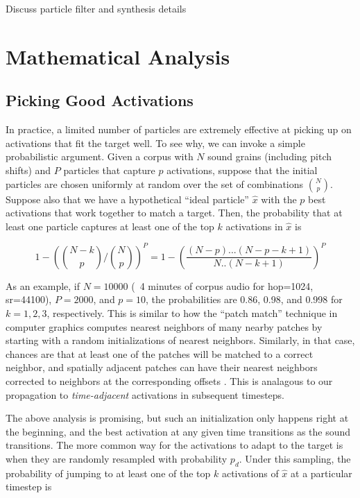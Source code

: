 \documentclass{article}
\begin{document}
Discuss particle filter and synthesis details


\section{Mathematical Analysis}

\subsection{Picking Good Activations}

In practice, a limited number of particles are extremely effective at picking up on activations that fit the target well.  To see why, we can invoke a simple probabilistic argument.  Given a corpus with $N$ sound grains (including pitch shifts) and $P$ particles that capture $p$ activations, suppose that the initial particles are chosen uniformly at random over the set of combinations $\binom{N}{p}$.  Suppose also that we have a hypothetical ``ideal particle'' $\hat{x}$ with the $p$ best activations that work together to match a target.  Then, the probability that at least one particle captures at least one of the top $k$ activations in $\hat{x}$ is  

\begin{equation}
    \label{eq:initialsampleprob}
    1 - \left(\binom{N-k}{p} / \binom{N}{p}\right)^P = 1 - \left( \frac{(N-p)...(N-p-k+1)}{N..(N-k+1)}\right) ^P
\end{equation}

As an example, if $N = 10000$ (~4 minutes of corpus audio for hop=1024, sr=44100), $P = 2000$, and $p=10$, the probabilities are 0.86, 0.98, and 0.998 for $k=1, 2, 3$, respectively.  This is similar to how the ``patch match'' technique in computer graphics \cite{Barnes:2009:PAR, Barnes:2010:TGP} computes nearest neighbors of many nearby patches by starting with a random initializations of nearest neighbors.  Similarly, in that case, chances are that at least one of the patches will be matched to a correct neighbor, and spatially adjacent patches can have their nearest neighbors corrected to neighbors at the corresponding offsets \cite{Barnes:2009:PAR}.  This is analagous to our propagation to {\em time-adjacent} activations in subsequent timesteps.

The above analysis is promising, but such an initialization only happens right at the beginning, and the best activation at any given time transitions as the sound transitions.  The more common way for the activations to adapt to the target is when they are randomly resampled with probability $p_d$.  Under this sampling, the probability of jumping to at least one of the top $k$ activations of $\hat{x}$ at a particular timestep is 
\end{document}
